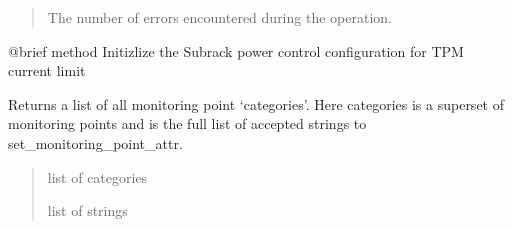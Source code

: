 \documentclass[letterpaper,10pt,english]{sphinxmanual}
\begin{document}
\begin{fulllineitems}
\begin{fulllineitems}
\begin{quote}
\begin{description}
\sphinxAtStartPar
The number of errors encountered during the operation.

\end{description}\end{quote}

\end{fulllineitems}


\begin{fulllineitems}
\label{\detokenize{apidocs:subrack_management_board.SubrackMngBoard.SubrackInitialConfiguration}}
\pysigstartsignatures
{}
\pysigstopsignatures
\sphinxAtStartPar
@brief method Initizlize the Subrack power control configuration for TPM current limit

\end{fulllineitems}


\begin{fulllineitems}
\label{\detokenize{apidocs:subrack_management_board.SubrackMngBoard.all_monitoring_categories}}
\pysigstartsignatures
{}
\pysigstopsignatures
\sphinxAtStartPar
Returns a list of all monitoring point ‘categories’.
Here categories is a super\sphinxhyphen{}set of monitoring points and is
the full list of accepted strings to set\_monitoring\_point\_attr.
\begin{quote}\begin{description}
\sphinxAtStartPar
list of categories

\sphinxAtStartPar
list of strings

\end{description}\end{quote}

\end{fulllineitems}



\end{fulllineitems}
\end{document}
